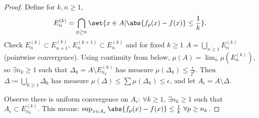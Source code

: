 \documentclass[twoside]{article}
\begin{document}
\begin{proof}
    Define for $k, n \geq 1$,
    \begin{equation*}
        E_n^{(k)} = \bigcap_{p \geq n} \set{x \in A | \abs{f_p(x) - f(x)} \leq \frac{1}{k}}.
    \end{equation*}
    Check $E_n^{(k)} \subset E_{n+1}^{(k)}$, $E_n^{(k+1)} \subset E_n^{(k)}$ and for fixed $k \geq 1$ $A = \bigcup_{n \geq 1} E_n^{(k)}$ (pointwise convergence).
    Using continuity from below, $\mu(A) = \lim_n \mu(E_n^{(k)})$, so $\exists {n_k \geq 1}$ such that $\Delta_k = A \setminus E_{n_k}^{(k)}$ has measure $\mu(\Delta_k) \leq \frac{\epsilon}{2^k}$.
    Then $\Delta \coloneqq \bigcup_{k \geq 1} \Delta_k$ has measure $\mu(\Delta) \leq \sum \mu(\Delta_k) \leq \epsilon$, and let $A_\epsilon = A \setminus \Delta$.

    Observe there is uniform convergence on $A_\epsilon$: $\forall k \geq 1$, $\exists n_k \geq 1$ such that $A_\epsilon \subset E_{n_k}^{(k)}$.
    This means: $\sup_{x \in A_\epsilon} \abs{f_p(x) - f(x)} \leq \frac{1}{k} \ \forall p \geq n_k$.
\end{proof}
\end{document}
